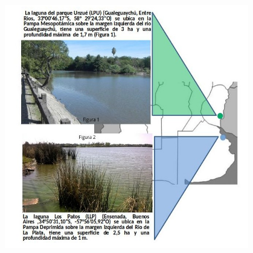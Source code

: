 \documentclass[final]{beamer}
\newlength{\sepwid}
\newlength{\onecolwid}
\begin{document}
\begin{frame}[t]
\begin{columns}[t]
                  
                  
         \begin{column}{\sepwid}  \end{column}
         
         
         
         
         \begin{column}{\onecolwid} %
         
        
         \begin{figure}
                  \includegraphics[width=.8\linewidth]{area_estudio.jpg}
				\end{figure}
				

\end{column}
\end{columns}
\end{frame}
\end{document}
